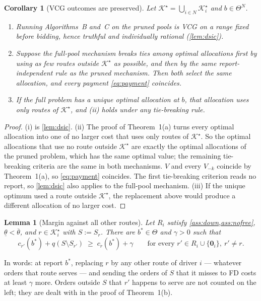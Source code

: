 \documentclass[11pt]{article}
\newtheorem{lemma}{Lemma}
\newtheorem{corollary}{Corollary}
\theoremstyle{definition}
\theoremstyle{remark}
\newcommand{\Ks}{\mathcal{K}^{\star}}
\newcommand{\thl}{\underline{\theta}}
\newcommand{\thu}{\overline{\theta}}
\newcommand{\idle}{\mathbf{0}}
\begin{document}
\begin{corollary}[VCG outcomes are preserved]\label{cor:vcg}
Let $\Ks=\bigcup_{i\in N}\Ks_i$ and $b\in\Theta^N$.
\begin{enumerate}[label=(\roman*), itemsep=1pt]
\item Running Algorithms~B and~C on the pruned pools is VCG on a range fixed
before bidding, hence truthful and individually rational (\cref{lem:dsic}).
\item Suppose the full-pool mechanism breaks ties among optimal allocations
first by using as few routes outside $\Ks$ as possible, and then by the same
report-independent rule as the pruned mechanism. Then both select the same
allocation, and every payment \eqref{eq:payment} coincides.
\item If the full problem has a unique optimal allocation at $b$, that
allocation uses only routes of $\Ks$, and (ii) holds under any tie-breaking rule.
\end{enumerate}
\end{corollary}

\begin{proof}
(i) is \cref{lem:dsic}. (ii) The proof of Theorem~1(a) turns every optimal
allocation into one of no larger cost that uses only routes of $\Ks$. So the
optimal allocations that use no route outside $\Ks$ are exactly the optimal
allocations of the pruned problem, which has the same optimal value; the
remaining tie-breaking criteria are the same in both mechanisms. $V$ and every
$V_{-k}$ coincide by Theorem~1(a), so \eqref{eq:payment} coincides. The first
tie-breaking criterion reads no report, so \cref{lem:dsic} also applies to the
full-pool mechanism. (iii) If the unique optimum used a route outside $\Ks$,
the replacement above would produce a different allocation of no larger cost.
\end{proof}

\begin{lemma}[Margin against all other routes]\label{lem:margin}
Let $R_i$ satisfy \cref{ass:down,ass:nofree}, $\thl<\thu$, and $r\in\Ks_i$
with $S:=S_r$. There are $b^*\in\Theta$ and $\gamma>0$ such that
\begin{equation}\label{eq:margin}
c_{r'}(b^*)+q(S\setminus S_{r'})\;\ge\;c_r(b^*)+\gamma
\qquad\text{for every } r'\in R_i\cup\{\idle_i\},\ r'\ne r .
\end{equation}
\end{lemma}

In words: at report $b^*$, replacing $r$ by any other route of driver $i$ ---
whatever orders that route serves --- and sending the orders of $S$ that it
misses to FD costs at least $\gamma$ more. Orders outside $S$ that $r'$ happens
to serve are not counted on the left; they are dealt with in the proof of
Theorem~1(b).
\end{document}
